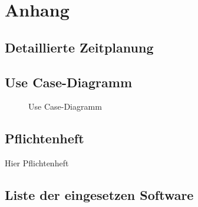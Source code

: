  \section{Anhang}
 \subsection{Detaillierte Zeitplanung}
 \label{app:Zeitplanung}



 \clearpage
 \subsection{Use Case-Diagramm}\label{usecasediagram}
 \label{app:UseCase}
 \begin{figure}[htb]
 \centering
 \caption{Use Case-Diagramm}

 \end{figure}

% 

 \clearpage

 
 \clearpage
 \subsection{Pflichtenheft}\label{pflichtenheft}
 Hier Pflichtenheft
 \clearpage

\subsection{Liste der eingesetzen
Software}\label{liste-der-eingesetzen-software}

